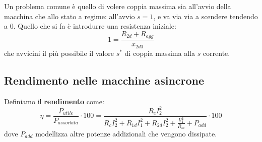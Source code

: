 \documentclass[a4paper,11pt]{article}
\begin{document}
Un problema comune è quello di volere coppia massima sia all'avvio della macchina che allo stato a regime: all'avvio $s = 1$, e va via via a scendere tendendo a $0$.
Quello che si fa è introdurre una resistenza iniziale:
$$
1 = \frac{R_{2d} + R_{agg}}{x_{2d0}}
$$
che avvicini il più possibile il valore $s^*$ di coppia massima alla $s$ corrente.

\subsection{Rendimento nelle macchine asincrone}
Definiamo il \textbf{rendimento} come:
$$
\eta = \frac{P_{utile}}{P_{assorbita}} \cdot 100 = \frac{R_c I_2^2}{R_c I_2^2 + R_{1d} I_1^2 + R_{2d} I_2^2 + \frac{V_1^2}{R_m} + P_{add}} \cdot 100
$$
dove $P_{add}$ modellizza altre potenze addizionali che vengono dissipate.
\end{document}
